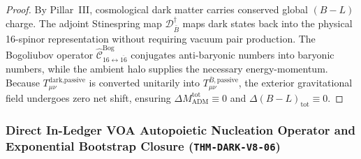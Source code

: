 \documentclass[11pt,onecolumn]{article}
\begin{document}
\begin{proof}
By Pillar~III, cosmological dark matter carries conserved global $(B-L)$ charge. The adjoint Stinespring map $\mathcal{D}_{\bar{B}}^\dagger$ maps dark states back into the physical 16-spinor representation without requiring vacuum pair production. The Bogoliubov operator $\hat{\mathcal{C}}_{16\leftrightarrow\overline{16}}^{\text{Bog}}$ conjugates anti-baryonic numbers into baryonic numbers, while the ambient halo supplies the necessary energy-momentum. Because $T_{\mu\nu}^{\text{dark,passive}}$ is converted unitarily into $T_{\mu\nu}^{\bar{B},\text{passive}}$, the exterior gravitational field undergoes zero net shift, ensuring $\Delta M_{\text{ADM}}^{\text{tot}} \equiv 0$ and $\Delta(B-L)_{\text{tot}} \equiv 0$.
\end{proof}

\subsubsection{Direct In-Ledger VOA Autopoietic Nucleation Operator and Exponential Bootstrap Closure (\texttt{THM-DARK-V8-06})}
\label{subsubsec:thm_dark_v8_06}
\end{document}
